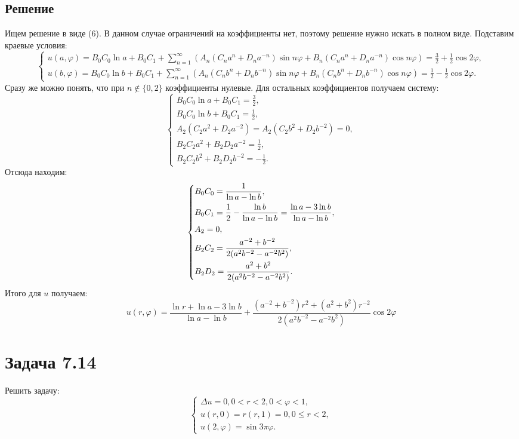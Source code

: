 \documentclass[11pt]{article}
\begin{document}
\subsection{Решение}
\label{sec:org29e072f}
Ищем решение в виде (6). В данном случае ограничений на коэффициенты нет, поэтому решение
нужно искать в полном виде. Подставим краевые условия:
\begin{equation*}
\begin{cases}
u(a, \varphi) = B_0C_0\ln a + B_0C_1 + \sum_{n = 1}^{\infty}(A_n(C_na^n + D_na^{-n})\sin n\varphi +
B_n(C_na^n + D_na^{-n})\cos n\varphi) = \frac32 + \frac12\cos2\varphi, \\
u(b, \varphi) = B_0C_0\ln b + B_0C_1 + \sum_{n = 1}^{\infty}(A_n(C_nb^n + D_nb^{-n})\sin n\varphi +
B_n(C_nb^n + D_nb^{-n})\cos n\varphi) = \frac12 - \frac12\cos2\varphi.
\end{cases}
\end{equation*}
Сразу же можно понять, что при $n \notin \{0, 2\}$ коэффициенты нулевые. Для остальных коэффициентов получаем систему:
\begin{equation*}
\begin{cases}
B_0C_0\ln a + B_0C_1 = \frac32, \\
B_0C_0\ln b + B_0C_1 = \frac12, \\
A_2(C_2a^2 + D_2a^{-2}) = A_2(C_2b^2 + D_2b^{-2}) = 0, \\
B_2C_2a^2 + B_2D_2a^{-2} = \frac12, \\
B_2C_2b^2 + B_2D_2b^{-2} = -\frac12.
\end{cases}
\end{equation*}
Отсюда находим:
\begin{equation*}
\begin{dcases}
B_0C_0 = \frac1{\ln a - \ln b}, \\
B_0C_1 = \frac12 - \frac{\ln b}{\ln a - \ln b} = \frac{\ln a - 3\ln b}{\ln a - \ln b}, \\
A_2 = 0, \\
B_2C_2 = \frac{a^{-2} + b^{-2}}{2(a^2b^{-2} - a^{-2}b^2)}, \\
B_2D_2 = \frac{a^2 + b^2}{2(a^2b^{-2} - a^{-2}b^2)}.
\end{dcases}
\end{equation*}
Итого для $u$ получаем:
\begin{equation}
u(r, \varphi) = \frac{\ln r + \ln a - 3\ln b}{\ln a - \ln b} +
\frac{(a^{-2} + b^{-2})r^2 + (a^2 + b^2)r^{-2}}{2(a^2b^{-2} - a^{-2}b^2)}\cos2\varphi
\end{equation}
\section{Задача 7.14}
\label{sec:orgb35660f}
Решить задачу:
\begin{equation}
\begin{cases}
\Delta u = 0, 0 < r < 2, 0 < \varphi < 1, \\
u(r, 0) = r(r, 1) = 0, 0 \leq r < 2, \\
u(2, \varphi) = \sin3\pi\varphi.
\end{cases}
\end{equation}
\end{document}
